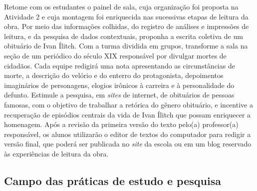 \documentclass[12pt]{extarticle}
\begin{document}
Retome com os estudantes o painel de sala, cuja organização foi
proposta na Atividade 2 e cuja montagem foi enriquecida nas sucessivas
etapas de leitura da obra. Por meio das informações colhidas, do
registro de análises e impressões de leitura, e da pesquisa de dados
contextuais, proponha a escrita coletiva de um obituário de
Ivan Ílitch. Com a turma dividida em grupos, transforme a sala na
seção de um periódico do século XIX responsável por divulgar mortes de
cidadãos. Cada equipe redigirá uma nota apresentando as circunstâncias
de morte, a descrição do velório e do enterro do protagonista,
depoimentos imaginários de personagens, elogios irônicos à carreira e
à personalidade do defunto. Estimule a pesquisa, em \emph{sites} de
internet, de obituários de pessoas famosas, com o objetivo de
trabalhar a retórica do gênero obituário, e incentive a
recuperação de episódios centrais da vida de Ivan Ílitch que possam
enriquecer a homenagem. Após a revisão da primeira versão do texto
pelo(a) professor(a) responsável, os alunos utilizarão o editor de
textos do computador para redigir a versão final, que poderá ser
publicada no \emph{site} da escola ou em um blog reservado às
experiências de leitura da obra.

\begin{comment}
\begin{quote}
No campo artístico"-literário busca"-se a ampliação do contato e a
análise mais fundamentada de manifestações culturais e artísticas em
geral. Está em jogo a continuidade da formação do leitor literário e do
desenvolvimento da fruição. A análise contextualizada de produções
artísticas e dos textos literários, com destaque para os clássicos,
intensifica"-se no Ensino Médio. Gêneros e formas diversas de produções
vinculadas à apreciação de obras artísticas e produções culturais
(resenhas, vlogs e podcasts literários, culturais etc.) ou a formas de
apropriação do texto literário, de produções cinematográficas e teatrais
e de outras manifestações artísticas (remidiações, paródias,
estilizações, videominutos, fanfics etc.) continuam a ser considerados
associados a habilidades técnicas e estéticas mais refinadas.

A escrita literária, por sua vez, ainda que não seja o foco central do
componente de Língua Portuguesa, também se mostra rica em possibilidades
expressivas. (\textsc{bncc}, p. 495-496).
\end{quote}
\end{comment}


\subsection{Campo das práticas de estudo e pesquisa}
\end{document}
